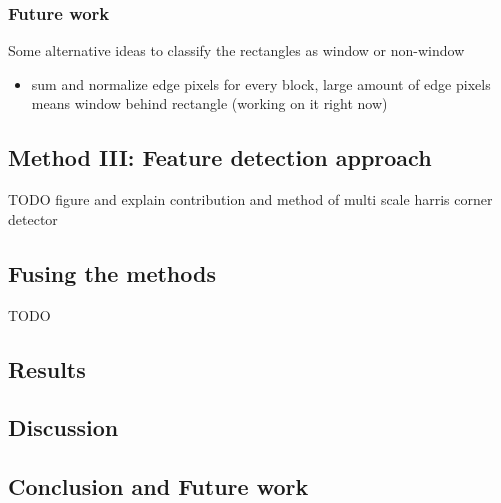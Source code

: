 \subsubsection{Future work}
Some alternative ideas to classify the rectangles as window or non-window
\begin{itemize}
	\item sum and normalize edge pixels for every block, large amount of edge pixels means window behind rectangle (working on it right now)
\end{itemize}


\subsection{Method III: Feature detection approach}
	TODO figure and explain contribution and method of multi scale harris corner detector

\subsection{Fusing the methods}
	TODO

\subsection{Results}
\subsection{Discussion}  %
\subsection{Conclusion and Future work}




% 
% 
% 
% 
% 
% 
% 
% 
